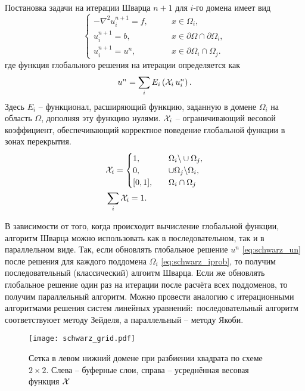 Постановка задачи на итерации Шварца $n+1$ для $i$-го домена имеет вид
\begin{equation}
\begin{cases}
\label{eq:schwarz_iprob}
-\nabla^2 u_i^{n+1} = f, \qquad &x\in\Omega_i,  \\
u_i^{n+1} = b, \qquad &x\in\partial\Omega \cap \partial\Omega_i, \\
u_i^{n+1} = u^n, \qquad &x\in\partial\Omega_i \cap \Omega_j.
\end{cases}
\end{equation}
где функция глобального решения на итерации определяется как
\begin{equation}
\label{eq:schwarz_un}
u^n = \sum_i E_i\left(\mathcal{X}_i \, u_i^{n}\right).
\end{equation}
Здесь $E_i$ -- функционал, расширяющий функцию, заданную в домене $\Omega_i$ на область $\Omega$, дополняя эту функцию нулями.
$\mathcal{X}_i$ -- ограничивающий весовой коэффициент, обеспечивающий корректное поведение глобальной функции в зонах перекрытия.
\begin{equation}
\label{eq:schwarz_chi}
\begin{aligned}
& \mathcal{X}_i = \begin{cases}
   1, \qquad &\Omega_i \backslash \cup \Omega_j, \\
   0, \qquad &\cup \Omega_j \backslash \Omega_i, \\
   [0, 1], \quad & \Omega_i \cap \Omega_j
  \end{cases} \\
& \sum_i \mathcal{X}_i = 1.
\end{aligned}
\end{equation}

В зависимости от того, когда происходит вычисление глобальной функции, алгоритм Шварца можно
использовать как в последовательном, так и в параллельном виде.
Так, если обновлять глобальное решение $u^n$ \cref{eq:schwarz_un} после решения
для каждого поддомена $\Omega_i$ \cref{eq:schwarz_iprob}, то получим последовательный (классический) алгоитм Шварца.
Если же обновлять глобальное решение один раз на итерации после расчёта всех поддоменов, то
получим параллельный алгоритм.
Можно провести аналогию с итерационными алгоритмами решения систем линейных уравнений:\
последовательный алгоритм соответствуюет методу Зейделя, а параллельный -- методу Якоби. 

\label{sec:schwarz_fem_grid}

\begin{figure}[h!]
\centering
\texttt{[image: schwarz\_grid.pdf]}
\caption{Сетка в левом нижний домене при разбиении квадрата по схеме $2\times2$. Слева -- буферные слои, справа -- усреднённая весовая функция $\mathcal{X}$}
\label{fig:schwarz_grid}
\end{figure}

